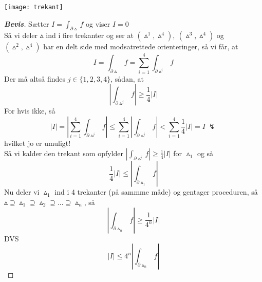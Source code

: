 \documentclass[10pt,a4paper]{article}
\theoremstyle{definition}
\begin{document}
\newpage
\texttt{[image: trekant]}
\begin{proof}[\textbf{Bevis}]
Sætter $I = \int_{\partial \vartriangle} f$ og viser $I=0$ \\

Så vi deler $\vartriangle$ ind i fire trekanter og ser at $(\vartriangle^1, \vartriangle^4), \ (\vartriangle^3, \vartriangle^4)$ og $(\vartriangle^2, \vartriangle^4)$ har en delt side med modsatrettede orienteringer, så vi får, at
$$ I = \int_{\partial \vartriangle} f = \sum\limits_{i=1}^4 \int_{\partial \vartriangle^i} f$$
Der må altså findes $j \in \{ 1, 2, 3, 4 \}$, sådan, at 
$$ \left| \int_{\partial \vartriangle^j} f \right| \geq \frac{1}{4} \left| I \right| $$
For hvis ikke, så
$$\left| I \right| = \left| \sum\limits_{i=1}^4 \int_{\partial \vartriangle^j} f \right| \leq  \sum\limits_{i=1}^4 \left| \int_{\partial \vartriangle^j} f \right| < \sum\limits_{i=1}^4 \frac{1}{4} \left| I \right| = I \ \lightning$$
hvilket jo er umuligt! \\
Så vi kalder den trekant som opfylder $ \left| \int_{\partial \vartriangle^j} f \right| \geq \frac{1}{4}\left| I \right| $ for $\vartriangle_1$ og så
$$ \frac{1}{4} \left| I \right| \leq \left| \int_{\partial \vartriangle_1} f \right|$$
Nu deler vi $\vartriangle_1$ ind i 4 trekanter (på sammme måde) og gentager proceduren, så $\vartriangle \supseteq \vartriangle_1 \supseteq \vartriangle_2 \supseteq ... \supseteq \vartriangle_n$, så
$$ \left| \int_{\partial \vartriangle_n} f \right| \geq \frac{1}{4^n} \left| I \right|$$
DVS
$$ \left| I \right| \leq 4^n  \left| \int_{\partial \vartriangle_n} f \right|$$


\end{proof}
\end{document}
